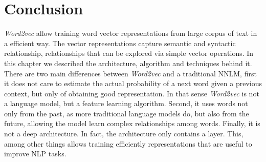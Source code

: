 \section{Conclusion}
\label{sec:sub-w2v-desc-conclusion}
\textit{Word2vec} allow training word vector representations from  large
corpus of text in a efficient way. The vector  representations  capture semantic and
syntactic relationship, relationships that can be explored via simple vector
operations. In this chapter we described the  architecture, algorithm and techniques
behind it.  There are two main differences between \textit{Word2vec} and a traditional \ac{NNLM}, first
it does not care to estimate the actual probability of  a next word given a
previous context, but only of obtaining good representation. In that sense
\textit{Word2vec} is not a  language model, but a feature learning algorithm.  Second, it uses
words not only from the past, as more traditional language models do, but
also from the future, allowing the model learn complex relationships among
words.  Finally, it is not a deep architecture. In fact, the architecture only
contains a layer. This, among other things allows  training efficiently
representations that are useful to improve  \ac{NLP} tasks.








